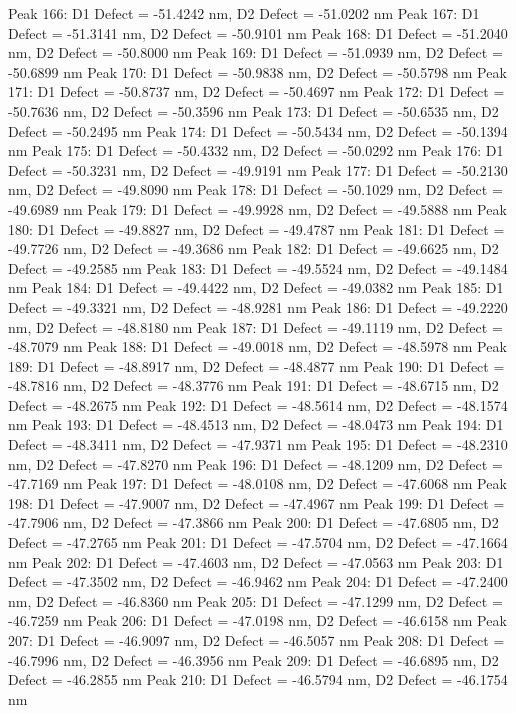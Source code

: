 \documentclass{article}
\begin{document}
Peak 166: D1 Defect = -51.4242 nm, D2 Defect = -51.0202 nm
Peak 167: D1 Defect = -51.3141 nm, D2 Defect = -50.9101 nm
Peak 168: D1 Defect = -51.2040 nm, D2 Defect = -50.8000 nm
Peak 169: D1 Defect = -51.0939 nm, D2 Defect = -50.6899 nm
Peak 170: D1 Defect = -50.9838 nm, D2 Defect = -50.5798 nm
Peak 171: D1 Defect = -50.8737 nm, D2 Defect = -50.4697 nm
Peak 172: D1 Defect = -50.7636 nm, D2 Defect = -50.3596 nm
Peak 173: D1 Defect = -50.6535 nm, D2 Defect = -50.2495 nm
Peak 174: D1 Defect = -50.5434 nm, D2 Defect = -50.1394 nm
Peak 175: D1 Defect = -50.4332 nm, D2 Defect = -50.0292 nm
Peak 176: D1 Defect = -50.3231 nm, D2 Defect = -49.9191 nm
Peak 177: D1 Defect = -50.2130 nm, D2 Defect = -49.8090 nm
Peak 178: D1 Defect = -50.1029 nm, D2 Defect = -49.6989 nm
Peak 179: D1 Defect = -49.9928 nm, D2 Defect = -49.5888 nm
Peak 180: D1 Defect = -49.8827 nm, D2 Defect = -49.4787 nm
Peak 181: D1 Defect = -49.7726 nm, D2 Defect = -49.3686 nm
Peak 182: D1 Defect = -49.6625 nm, D2 Defect = -49.2585 nm
Peak 183: D1 Defect = -49.5524 nm, D2 Defect = -49.1484 nm
Peak 184: D1 Defect = -49.4422 nm, D2 Defect = -49.0382 nm
Peak 185: D1 Defect = -49.3321 nm, D2 Defect = -48.9281 nm
Peak 186: D1 Defect = -49.2220 nm, D2 Defect = -48.8180 nm
Peak 187: D1 Defect = -49.1119 nm, D2 Defect = -48.7079 nm
Peak 188: D1 Defect = -49.0018 nm, D2 Defect = -48.5978 nm
Peak 189: D1 Defect = -48.8917 nm, D2 Defect = -48.4877 nm
Peak 190: D1 Defect = -48.7816 nm, D2 Defect = -48.3776 nm
Peak 191: D1 Defect = -48.6715 nm, D2 Defect = -48.2675 nm
Peak 192: D1 Defect = -48.5614 nm, D2 Defect = -48.1574 nm
Peak 193: D1 Defect = -48.4513 nm, D2 Defect = -48.0473 nm
Peak 194: D1 Defect = -48.3411 nm, D2 Defect = -47.9371 nm
Peak 195: D1 Defect = -48.2310 nm, D2 Defect = -47.8270 nm
Peak 196: D1 Defect = -48.1209 nm, D2 Defect = -47.7169 nm
Peak 197: D1 Defect = -48.0108 nm, D2 Defect = -47.6068 nm
Peak 198: D1 Defect = -47.9007 nm, D2 Defect = -47.4967 nm
Peak 199: D1 Defect = -47.7906 nm, D2 Defect = -47.3866 nm
Peak 200: D1 Defect = -47.6805 nm, D2 Defect = -47.2765 nm
Peak 201: D1 Defect = -47.5704 nm, D2 Defect = -47.1664 nm
Peak 202: D1 Defect = -47.4603 nm, D2 Defect = -47.0563 nm
Peak 203: D1 Defect = -47.3502 nm, D2 Defect = -46.9462 nm
Peak 204: D1 Defect = -47.2400 nm, D2 Defect = -46.8360 nm
Peak 205: D1 Defect = -47.1299 nm, D2 Defect = -46.7259 nm
Peak 206: D1 Defect = -47.0198 nm, D2 Defect = -46.6158 nm
Peak 207: D1 Defect = -46.9097 nm, D2 Defect = -46.5057 nm
Peak 208: D1 Defect = -46.7996 nm, D2 Defect = -46.3956 nm
Peak 209: D1 Defect = -46.6895 nm, D2 Defect = -46.2855 nm
Peak 210: D1 Defect = -46.5794 nm, D2 Defect = -46.1754 nm
\end{document}

